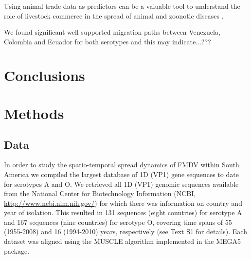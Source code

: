 \documentclass[10pt]{article}
\begin{document}
Using animal trade data as predictors can be a valuable tool to understand the role of livestock commerce in the spread of animal and zoonotic diseases \cite{Nelson2011}.


We found significant well supported migration paths between Venezuela, Colombia and Ecuador for both serotypes and this may indicate...???%




\section*{Conclusions}
\section*{Methods}

\subsection*{Data}

In order to study the spatio-temporal spread dynamics of FMDV within South America we compiled the largest database of 1D (VP1) gene sequences to date for serotypes A and O. We retrieved all 1D (VP1) genomic sequences available from the National Center for Biotechnology Information (NCBI, \url{ http://www.ncbi.nlm.nih.gov/}) for which there was information on country and year of isolation.  This resulted in 131 sequences (eight countries) for serotype A and 167 sequences (nine countries) for serotype O, covering time spans of 55 (1955-2008) and 16 (1994-2010) years, respectively (see Text S1 for details). Each dataset was aligned using the MUSCLE algorithm implemented in the MEGA5 \cite{MEGA} package.
\end{document}

